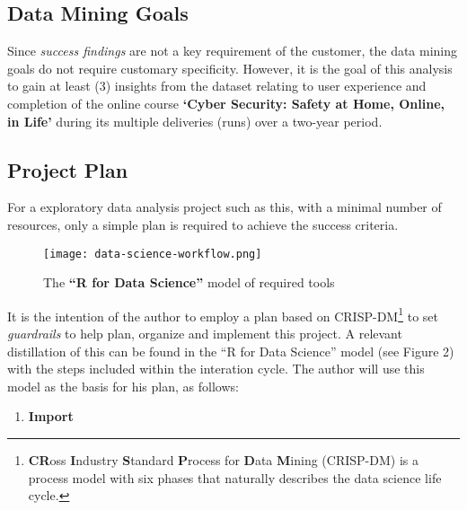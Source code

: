 \documentclass[
]{article}
\providecommand{\tightlist}{%
  \setlength{\itemsep}{0pt}\setlength{\parskip}{0pt}}
\begin{document}
\hypertarget{data-mining-goals}{%
\subsection{Data Mining Goals}\label{data-mining-goals}}

Since \emph{success findings} are not a key requirement of the customer,
the data mining goals do not require customary specificity. However, it
is the goal of this analysis to gain at least (3) insights from the
dataset relating to user experience and completion of the online course
\textbf{`Cyber Security: Safety at Home, Online, in Life'} during its
multiple deliveries (runs) over a two-year period.

\newpage

\hypertarget{project-plan}{%
\subsection{Project Plan}\label{project-plan}}

For a exploratory data analysis project such as this, with a minimal
number of resources, only a simple plan is required to achieve the
success criteria.

\begin{figure}
\centering
\texttt{[image: data-science-workflow.png]}
\caption[The \textbf{``R for Data Science''} model of required
tools]{The \textbf{``R for Data Science''} model of required
tools\footnotemark{}}
\end{figure}

It is the intention of the author to employ a plan based on
CRISP-DM\footnote{\textbf{CR}oss \textbf{I}ndustry \textbf{S}tandard
  \textbf{P}rocess for \textbf{D}ata \textbf{M}ining (CRISP-DM) is a
  process model with six phases that naturally describes the data
  science life cycle.} to set \emph{guardrails} to help plan, organize
and implement this project. A relevant distillation of this can be found
in the ``R for Data Science'' model (see Figure 2) with the steps
included within the interation cycle. The author will use this model as
the basis for his plan, as follows:

\begin{enumerate}
\def\labelenumi{\arabic{enumi}.}
\tightlist
\item
  \textbf{Import}
\end{enumerate}
\end{document}
